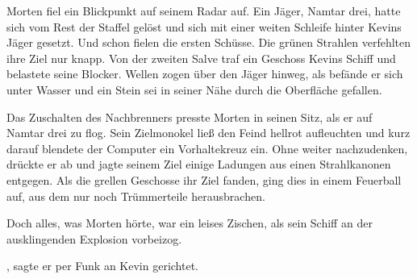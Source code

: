 Morten fiel ein Blickpunkt auf seinem Radar auf. Ein Jäger, Namtar drei, hatte sich vom Rest der Staffel gelöst und sich mit einer weiten Schleife hinter Kevins Jäger gesetzt. Und schon fielen die ersten Schüsse. Die grünen Strahlen verfehlten ihre Ziel nur knapp. Von der zweiten Salve traf ein Geschoss Kevins Schiff und belastete seine Blocker. Wellen zogen über den Jäger hinweg, als befände er sich unter Wasser und ein Stein sei in seiner Nähe durch die Oberfläche gefallen.

\par

Das Zuschalten des Nachbrenners presste Morten in seinen Sitz, als er auf Namtar drei zu flog. Sein Zielmonokel ließ den Feind hellrot aufleuchten und kurz darauf blendete der Computer ein Vorhaltekreuz ein. Ohne weiter nachzudenken, drückte er ab und jagte seinem Ziel einige Ladungen aus einen Strahlkanonen entgegen. Als die grellen Geschosse ihr Ziel fanden, ging dies in einem Feuerball auf, aus dem nur noch Trümmerteile herausbrachen.

\par

Doch alles, was Morten hörte, war ein leises Zischen, als sein Schiff an der ausklingenden Explosion vorbeizog.

\par

, sagte er per Funk an Kevin gerichtet. 
